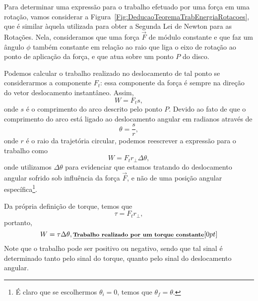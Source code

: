 Para determinar uma expressão para o trabalho efetuado por uma força em uma rotação, vamos considerar a Figura~\ref{Fig:DeducaoTeoremaTrabEnergiaRotacoes}, que é similar àquela utilizada para obter a Segunda Lei de Newton para as Rotações. Nela, consideramos que uma força $\vec{F}$ de módulo constante e que faz um ângulo $\phi$ também constante em relação ao raio que liga o eixo de rotação ao ponto de aplicação da força, e que atua sobre um ponto $P$ do disco.

Podemos calcular o trabalho realizado no deslocamento de tal ponto se considerarmos a componente $F_t$: essa componente da força é sempre na direção do vetor deslocamento instantâneo. Assim,
\begin{equation}
    W = F_t s,
\end{equation}
%
onde $s$ é o comprimento do arco descrito pelo ponto $P$. Devido ao fato de que o comprimento do arco está ligado ao deslocamento angular em radianos através de
\begin{equation}
    \theta = \frac{s}{r},
\end{equation}
%
onde $r$ é o raio da trajetória circular, podemos reescrever a expressão para o trabalho como
\begin{equation}
    W = F_t r_\perp \Delta\theta,
\end{equation}
%
onde utilizamos $\Delta \theta$ para evidenciar que estamos tratando do deslocamento angular sofrido sob influência da força $\vec{F}$, e não de uma posição angular específica\footnote{É claro que se escolhermos $\theta_i = 0$, temos que $\theta_f = \theta$.}.

Da própria definição de torque, temos que
\begin{equation}
    \tau = F_t r_\perp,
\end{equation}
%
portanto,
\begin{equation}
    W = \tau \Delta\theta, \relax{\footnotesize\emph{\textbf{Trabalho realizado por um torque constante}}}[0pt]
\end{equation}
%
Note que o trabalho pode ser positivo ou negativo, sendo que tal sinal é determinado tanto pelo sinal do torque, quanto pelo sinal do deslocamento angular.

